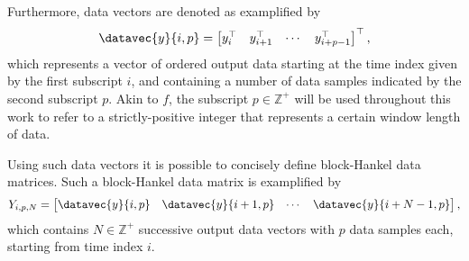 Furthermore, data vectors are denoted as examplified by
\begin{align*}
    \datavec{y}{i,p} = \begin{bmatrix} y_i^\top & y_{i+1}^\top & \cdots & y_{i+p-1}^\top\end{bmatrix}^\top,
\end{align*}
which represents a vector of ordered output data starting at the time index given by the first subscript $i$, and containing a number of data samples indicated by the second subscript $p$. Akin to $f$, the subscript $p\in\mathbb{Z}^+$ will be used throughout this work to refer to a strictly-positive integer that represents a certain window length of data.

Using such data vectors it is possible to concisely define block-Hankel data matrices. Such a block-Hankel data matrix is examplified by
\begin{align*}
    Y_{i,p,N} = \begin{bmatrix}
        \datavec{y}{i,p} & \datavec{y}{i+1,p} & \cdots & \datavec{y}{i+N-1,p}
    \end{bmatrix},
\end{align*}
which contains $N\in\mathbb{Z}^+$ successive output data vectors with $p$ data samples each, starting from time index $i$.